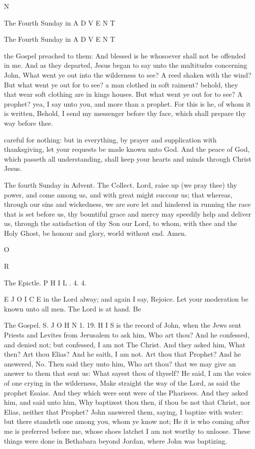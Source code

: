 N

The Fourth Sunday in A D V E N T

The Fourth Sunday in A D V E N T

the Gospel preached to them: And blessed is he whosoever shall not be offended in me. And as they departed, Jesus began to say unto the multitudes concerning John, What went ye out into the wilderness to see? A reed shaken with the wind? But what went ye out for to see? a man clothed in soft raiment? behold, they that wear soft clothing are in kings houses. But what went ye out for to see? A prophet? yea, I say unto you, and more than a prophet. For this is he, of whom it is written, Behold, I send my messenger before thy face, which shall prepare thy way before thee.

careful for nothing: but in everything, by prayer and supplication with thanksgiving, let your requests be made known unto God. And the peace of God, which passeth all understanding, shall keep your hearts and minds through Christ Jesus.

The fourth Sunday in Advent. The Collect. Lord, raise up (we pray thee) thy power, and come among us, and with great might succour us; that whereas, through our sins and wickedness, we are sore let and hindered in running the race that is set before us, thy bountiful grace and mercy may speedily help and deliver us, through the satisfaction of thy Son our Lord, to whom, with thee and the Holy Ghost, be honour and glory, world without end. Amen.

O

R

The Epictle. P H I L . 4. 4.

E J O I C E in the Lord alway; and again I say, Rejoice. Let your moderation be known unto all men. The Lord is at hand. Be

The Gospel. S. J O H N 1. 19. H I S is the record of John, when the Jews sent Priests and Levites from Jerusalem to ask him, Who art thou? And he confessed, and denied not; but confessed, I am not The Christ. And they asked him, What then? Art thou Elias? And he saith, I am not. Art thou that Prophet? And he answered, No. Then said they unto him, Who art thou? that we may give an answer to them that sent us: What sayest thou of thyself? He said, I am the voice of one crying in the wilderness, Make straight the way of the Lord, as said the prophet Esaias. And they which were sent were of the Pharisees. And they asked him, and said unto him, Why baptizest thou then, if thou be not that Christ, nor Elias, neither that Prophet? John answered them, saying, I baptize with water: but there standeth one among you, whom ye know not; He it is who coming after me is preferred before me, whose shoes latchet I am not worthy to unloose. These things were done in Bethabara beyond Jordan, where John was baptizing.

